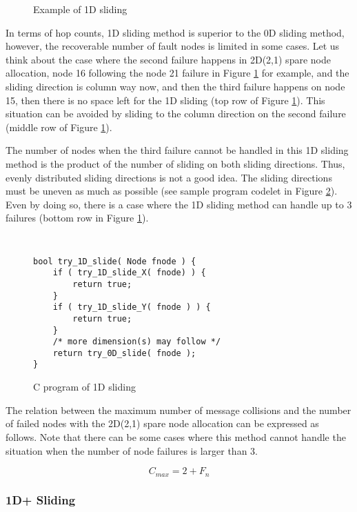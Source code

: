 \documentclass[10pt,conference,a4paper,fleqn]{IEEEtran}
\begin{document}
\begin{figure}[ht]
\begin{center}
  \caption{Example of 1D sliding} 
  \label{fig:1d-sliding}
\end{center}
\end{figure}

In terms of hop counts, 1D sliding method is superior to the
0D sliding method, however, the recoverable number of fault nodes is
limited in some cases. Let us think about the case where the second
failure happens in 2D(2,1) spare node allocation, node 16 following
the node 21 failure in Figure
\ref{fig:1d-sliding} for example, and the sliding direction is column
way now, and then the third failure happens on node 15, then there is
no space left for the 1D sliding (top row of Figure
\ref{fig:1d-sliding}). This situation can be avoided by 
sliding to the column direction on the second failure (middle row of
Figure \ref{fig:1d-sliding}). 

The number of nodes when the third failure cannot be handled in this
1D sliding method is the product of the number of sliding on both
sliding directions. Thus, evenly distributed sliding directions is not
a good idea. The sliding directions must be uneven as much as
possible (see sample program codelet in Figure \ref{fig:1d-prog}).
Even by doing so, there is a case where the 1D sliding method can
handle up to 3 failures (bottom row in Figure \ref{fig:1d-sliding}).

\begin{figure}[ht]
\small\tt
\begin{verbatim}
bool try_1D_slide( Node fnode ) {
    if ( try_1D_slide_X( fnode) ) {
        return true;
    }
    if ( try_1D_slide_Y( fnode ) ) {
        return true;
    }
    /* more dimension(s) may follow */
    return try_0D_slide( fnode );
}
\end{verbatim}
\caption{C program of 1D sliding} 
\label{fig:1d-prog}
\end{figure}

The relation between the maximum number of message collisions and the
number of failed nodes with the 2D(2,1) spare node allocation can be
expressed as follows. Note that there can be some cases where this
method cannot handle the situation when the number of node failures is
larger than 3. 

\[
C_{max} = 2 + F_n
\]

\subsubsection{1D+ Sliding}
\end{document}
